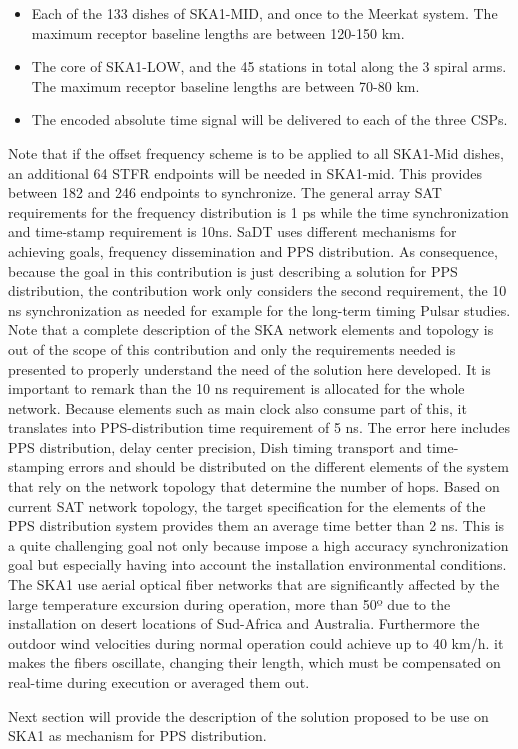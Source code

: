 \begin{itemize}
	\item {Each of the 133 dishes of SKA1-MID, and once to the Meerkat system. The maximum receptor baseline lengths are between 120-150 km.}
	\item {The core of SKA1-LOW, and the 45 stations in total along the 3 spiral arms. The maximum receptor baseline lengths are between 70-80 km. }
	\item {The encoded absolute time signal will be delivered to each of the three CSPs.}
\end{itemize}
 
Note that if the offset frequency scheme is to be applied to all SKA1-Mid dishes, an additional 64 STFR endpoints will be needed in SKA1-mid. This provides between 182 and 246 endpoints to synchronize. 
The general array SAT requirements for the frequency distribution is 1 ps while the time synchronization and time-stamp requirement is 10ns. SaDT uses different mechanisms for achieving goals, frequency dissemination and PPS distribution. As consequence, because the goal in this contribution is just describing a solution for PPS distribution, the contribution work only considers the second requirement, the 10 ns synchronization as needed for example for the long-term timing Pulsar studies. Note that a complete description of the SKA network elements and topology is out of the scope of this contribution and only the requirements needed is presented to properly understand the need of the solution here developed. 
It is important to remark than the 10 ns requirement is allocated for the whole network. Because elements such as main clock also consume part of this, it translates into PPS-distribution time requirement of 5 ns. The error here includes PPS distribution, delay center precision, Dish timing transport and time-stamping errors and should be distributed on the different elements of the system that rely on the network topology that determine the number of hops. Based on current SAT network topology, the target specification for the elements of the PPS distribution system provides them an average time better than 2 ns. This is a quite challenging goal not only because impose a high accuracy synchronization goal but especially having into account the installation environmental conditions. The SKA1 use aerial optical fiber networks that are significantly affected by the large temperature excursion during operation, more than 50º due to the installation on desert locations of Sud-Africa and Australia. Furthermore the outdoor wind velocities during normal operation could achieve up to 40 km/h. it makes the fibers oscillate, changing their length, which must be compensated on real-time during execution or averaged them out. 

Next section will provide the description of the solution proposed to be use on SKA1 as mechanism for PPS distribution. 
